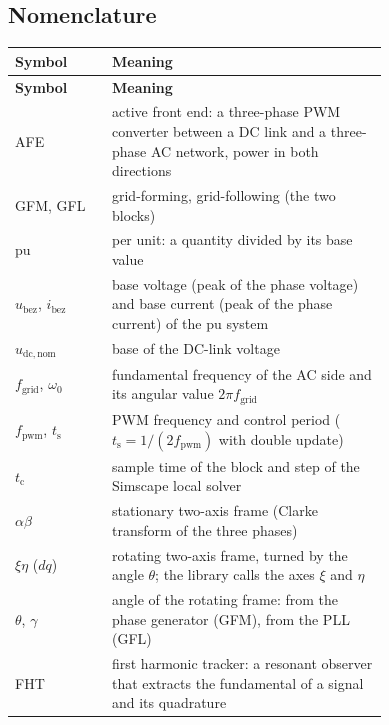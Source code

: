 \documentclass[11pt,a4paper]{scrartcl}
\newcommand{\ped}[1]{_{\mathrm{#1}}}
\begin{document}


\tableofcontents
\listoffigures
\listoftables
\newpage

\begin{onehalfspace}

\section*{Nomenclature}
\label{sec:nomenclature}

\begingroup
{}
\begin{longtable}{@{} l p{0.74\linewidth} @{}}
	\toprule
	\textbf{Symbol} & \textbf{Meaning} \\
	\midrule
	\endfirsthead
	\toprule
	\textbf{Symbol} & \textbf{Meaning} \\
	\midrule
	\endhead
	\bottomrule
	\endfoot
	\bottomrule
	\endlastfoot
	AFE & active front end: a three-phase PWM converter between a DC link and a three-phase AC network, power in both directions \\
	GFM, GFL & grid-forming, grid-following (the two blocks) \\
	pu & per unit: a quantity divided by its base value \\
	$u\ped{bez}$, $i\ped{bez}$ & base voltage (peak of the phase voltage) and base current (peak of the phase current) of the pu system \\
	$u\ped{dc,nom}$ & base of the DC-link voltage \\
	$f\ped{grid}$, $\omega\ped{0}$ & fundamental frequency of the AC side and its angular value $2\pi f\ped{grid}$ \\
	$f\ped{pwm}$, $t\ped{s}$ & PWM frequency and control period ($t\ped{s} = 1/(2 f\ped{pwm})$ with double update) \\
	$t\ped{c}$ & sample time of the block and step of the Simscape local solver \\
	$\alpha\beta$ & stationary two-axis frame (Clarke transform of the three phases) \\
	$\xi\eta$ ($dq$) & rotating two-axis frame, turned by the angle $\theta$; the library calls the axes $\xi$ and $\eta$ \\
	$\theta$, $\gamma$ & angle of the rotating frame: from the phase generator (GFM), from the PLL (GFL) \\
	FHT & first harmonic tracker: a resonant observer that extracts the fundamental of a signal and its quadrature \\

\end{longtable}
\end{onehalfspace}
\end{document}
